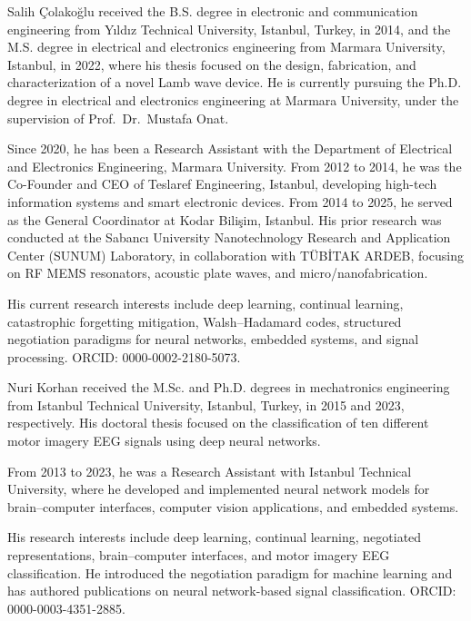 \documentclass[preprint,review,12pt]{elsarticle}
\begin{document}
\begin{biography}{Salih \c{C}olako\u{g}lu}
received the B.S. degree in electronic and communication engineering from Y{\i}ld{\i}z Technical University, Istanbul, Turkey, in 2014, and the M.S. degree in electrical and electronics engineering from Marmara University, Istanbul, in 2022, where his thesis focused on the design, fabrication, and characterization of a novel Lamb wave device. He is currently pursuing the Ph.D. degree in electrical and electronics engineering at Marmara University, under the supervision of Prof.\ Dr.\ Mustafa Onat.

Since 2020, he has been a Research Assistant with the Department of Electrical and Electronics Engineering, Marmara University. From 2012 to 2014, he was the Co-Founder and CEO of Teslaref Engineering, Istanbul, developing high-tech information systems and smart electronic devices. From 2014 to 2025, he served as the General Coordinator at Kodar Bili\c{s}im, Istanbul. His prior research was conducted at the Sabanc{\i} University Nanotechnology Research and Application Center (SUNUM) Laboratory, in collaboration with T\"{U}B\.{I}TAK ARDEB, focusing on RF MEMS resonators, acoustic plate waves, and micro/nanofabrication.

His current research interests include deep learning, continual learning, catastrophic forgetting mitigation, Walsh--Hadamard codes, structured negotiation paradigms for neural networks, embedded systems, and signal processing. ORCID: 0000-0002-2180-5073.
\end{biography}

\begin{biography}{Nuri Korhan}
received the M.Sc. and Ph.D. degrees in mechatronics engineering from Istanbul Technical University, Istanbul, Turkey, in 2015 and 2023, respectively. His doctoral thesis focused on the classification of ten different motor imagery EEG signals using deep neural networks.

From 2013 to 2023, he was a Research Assistant with Istanbul Technical University, where he developed and implemented neural network models for brain--computer interfaces, computer vision applications, and embedded systems.

His research interests include deep learning, continual learning, negotiated representations, brain--computer interfaces, and motor imagery EEG classification. He introduced the negotiation paradigm for machine learning and has authored publications on neural network-based signal classification. ORCID: 0000-0003-4351-2885.
\end{biography}
\end{document}
